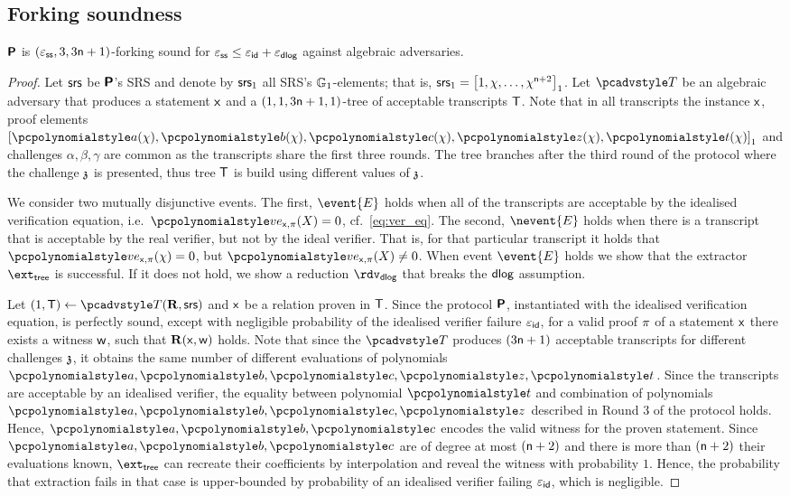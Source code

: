\documentclass[runningheads,10pt]{llncs}
\begin{document}
\subsection{Forking soundness}
\begin{lemma}
\label{lem:plonkprot_ss}
$\bm{\mathsf{P}}$ is $(\varepsilon_{\mathsf{ss}}, 3, 3 \mathsf{n} + 1)$-forking sound
for $\varepsilon_{\mathsf{ss}} \leq \varepsilon_{\mathsf{id}} + \varepsilon_{\mathsf{dlog}}$ against algebraic adversaries.
\end{lemma}
\begin{proof}
  Let $\mathsf{srs}$ be $\bm{\mathsf{P}}$'s SRS and denote by $\mathsf{srs}_1$ all SRS's
  $\mathbb{G}_1$-elements; that is,
  $\mathsf{srs}_1 = \left[1, \chi, \ldots, \chi^{\mathsf{n} + 2}\right]_{1}$. Let $\tdv$ be an
  algebraic adversary that produces a statement $\mathsf{x}$ and a
  $(1, 1, 3\mathsf{n} + 1, 1)$-tree of acceptable transcripts $\mathsf{T}$.  Note that in
  all transcripts the instance $\mathsf{x}$, proof elements
  $\gone{\p{a}(\chi), \p{b}(\chi), \p{c}(\chi), \p{z}(\chi), \p{t}(\chi)}$ and
  challenges $\alpha, \beta, \gamma$ are common as the transcripts share the
  first three rounds. The tree branches after the third round of the protocol
  where the challenge $\mathfrak{z}$ is presented, thus tree $\mathsf{T}$ is build using
  different values of $\mathfrak{z}$.

  We consider two mutually disjunctive events. The first, $\event{E}$ holds when
  all of the transcripts are acceptable by the idealised verification equation,
  i.e.~$\vereq_{\inp, \zkproof}(X) = 0$, cf.~\cref{eq:ver_eq}. The second,
  $\nevent{E}$ holds when there is a transcript that is acceptable by the real
  verifier, but not by the ideal verifier. That is, for that particular
  transcript it holds that $\vereq_{\inp, \zkproof}(\chi) = 0$, but
  $\vereq_{\inp, \zkproof}(X) \neq 0$.  When event $\event{E}$ holds we show
  that the extractor $\extt$ is successful. If it does not hold, we show a
  reduction $\rdvdlog$ that breaks the $\mathsf{dlog}$ assumption.

   Let $(1, \tree) \gets \tdv(\REL, \srs)$ and
  $\mathsf{x}$ be a relation proven in $\mathsf{T}$. Since the protocol $\bm{\mathsf{P}}$,
  instantiated with the idealised verification equation, is perfectly sound,
  except with negligible probability of the idealised verifier failure $\varepsilon_{\mathsf{id}}$,
  for a valid proof $\pi$ of a statement $\mathsf{x}$ there exists a witness
  $\mathsf{w}$, such that $\mathbf{R}(\mathsf{x}, \mathsf{w})$ holds. Note that since the $\tdv$
  produces $(3 \mathsf{n} + 1)$ acceptable transcripts for different challenges
  $\mathfrak{z}$, it obtains the same number of different evaluations of polynomials
  $\p{a}, \p{b}, \p{c}, \p{z}, \p{t}$. Since the transcripts are acceptable by
  an idealised verifier, the equality between polynomial $\p{t}$ and combination
  of polynomials $\p{a}, \p{b}, \p{c}, \p{z}$ described in Round 3 of the
  protocol holds. Hence, $\p{a}, \p{b}, \p{c}$ encodes the valid witness for the
  proven statement. Since $\p{a}, \p{b}, \p{c}$ are of degree at most
  $(\mathsf{n} + 2)$ and there is more than $(\mathsf{n} + 2)$ their evaluations known,
  $\extt$ can recreate their coefficients by interpolation and reveal the
  witness with probability $1$. Hence, the probability that extraction fails in
  that case is upper-bounded by probability of an idealised verifier failing
  $\varepsilon_{\mathsf{id}}$, which is negligible.


\end{proof}
\end{document}
